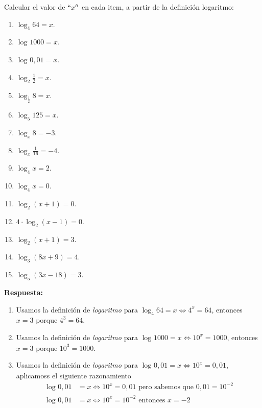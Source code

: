 \documentclass[12pt]{examdesign}
\theoremstyle{plain}
\theoremstyle{definition}
\theoremstyle{remark}
\begin{document}
	
	
    \begin{shortanswer}[title={Leemos el material de consulta y realizamos las actividades propuestas}]
    	
    	\begin{question}
    		Calcular el valor de $``x''$ en cada item, a partir de la definición logaritmo:
    		\begin{enumerate}
    			\item $\log_{4}64=x$.
    			\item $\log_{}1000=x$.
    			\item $\log_{}0,01=x$.
    			\item $\log_{2}\frac{1}{2}=x$.
    			\item $\log_{\frac{1}{2}}8=x$.
    			\item $\log_{5}125=x$.
    			\item $\log_{x}8=-3$.
    			\item $\log_{x}\frac{1}{16}=-4$.
    			\item $\log_{4}x=2$.
    			\item $\log_{4}x=0$.
    			\item $\log_{2}(x+1)=0$.
    			\item $4\cdot\log_{2}(x-1)=0$.
    			\item $\log_{2}(x+1)=3$.
    			\item $\log_{3}(8x+9)=4$.
    			\item $\log_{5}(3x-18)=3$.
    		\end{enumerate}
    	    \begin{answer}
    	    	\textbf{Respuesta:}
    	    	\begin{enumerate}
    	    		\item Usamos la definición de \textit{logaritmo} para $\log_{4}64=x\Leftrightarrow 4^{x}=64$, entonces $x=3$ porque $4^{3}=64$.
    	    		\item Usamos la definición de \textit{logaritmo} para $\log_{}1000=x\Leftrightarrow 10^{x}=1000$, entonces $x=3$ porque $10^{3}=1000$.
    	    		\item Usamos la definición de \textit{logaritmo} para $\log_{}0,01=x\Leftrightarrow 10^{x}=0,01$, aplicamoss el siguiente razonamiento
    	    		\begin{align*}
    	    			\log_{}0,01&=x\Leftrightarrow 10^{x}=0,01\mbox{ pero sabemos que $0,01=10^{-2}$}\\
    	    			\log_{}0,01&=x\Leftrightarrow 10^{x}=10^{-2} \mbox{ entonces $x=-2$}
    	    		\end{align*}
    	    		 

\end{enumerate}
\end{answer}
\end{question}
\end{shortanswer}
\end{document}

